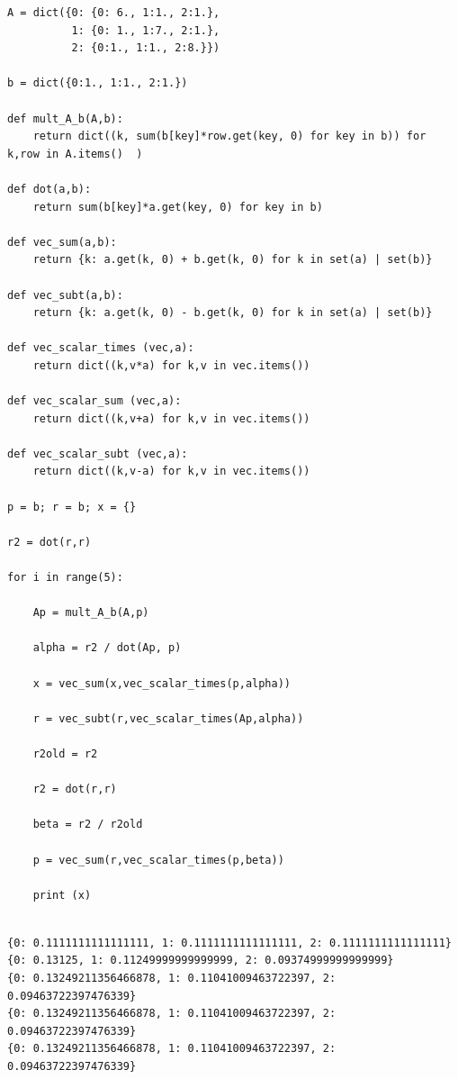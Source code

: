 \documentclass[12pt,fleqn]{article}\usepackage{../../common}
\begin{document}
\begin{verbatim}
A = dict({0: {0: 6., 1:1., 2:1.},
          1: {0: 1., 1:7., 2:1.},
          2: {0:1., 1:1., 2:8.}})

b = dict({0:1., 1:1., 2:1.})

def mult_A_b(A,b):
    return dict((k, sum(b[key]*row.get(key, 0) for key in b)) for k,row in A.items()  )

def dot(a,b):
    return sum(b[key]*a.get(key, 0) for key in b)

def vec_sum(a,b):
    return {k: a.get(k, 0) + b.get(k, 0) for k in set(a) | set(b)}

def vec_subt(a,b):
    return {k: a.get(k, 0) - b.get(k, 0) for k in set(a) | set(b)}

def vec_scalar_times (vec,a):
    return dict((k,v*a) for k,v in vec.items())

def vec_scalar_sum (vec,a):
    return dict((k,v+a) for k,v in vec.items())

def vec_scalar_subt (vec,a):
    return dict((k,v-a) for k,v in vec.items())

p = b; r = b; x = {}

r2 = dot(r,r)

for i in range(5):

    Ap = mult_A_b(A,p)

    alpha = r2 / dot(Ap, p)

    x = vec_sum(x,vec_scalar_times(p,alpha))

    r = vec_subt(r,vec_scalar_times(Ap,alpha))

    r2old = r2

    r2 = dot(r,r)

    beta = r2 / r2old

    p = vec_sum(r,vec_scalar_times(p,beta))

    print (x)
    
\end{verbatim}

\begin{verbatim}
{0: 0.1111111111111111, 1: 0.1111111111111111, 2: 0.1111111111111111}
{0: 0.13125, 1: 0.11249999999999999, 2: 0.09374999999999999}
{0: 0.13249211356466878, 1: 0.11041009463722397, 2: 0.09463722397476339}
{0: 0.13249211356466878, 1: 0.11041009463722397, 2: 0.09463722397476339}
{0: 0.13249211356466878, 1: 0.11041009463722397, 2: 0.09463722397476339}
\end{verbatim}
\end{document}
